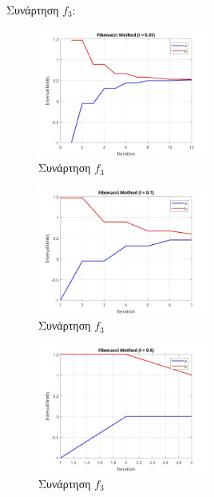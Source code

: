 Συνάρτηση $f_3$:
\begin{figure}[H] %
    \centering
    \includegraphics[width=0.5\textwidth]{media/fibonaccif3_001} %
    \caption{Συνάρτηση $f_3$}
\end{figure}
\begin{figure}[H] %
    \centering
    \includegraphics[width=0.5\textwidth]{media/fibonaccif3_01} %
    \caption{Συνάρτηση $f_3$}
\end{figure}
\begin{figure}[H] %
    \centering
    \includegraphics[width=0.5\textwidth]{media/fibonaccif3_05} %
    \caption{Συνάρτηση $f_3$}
\end{figure}